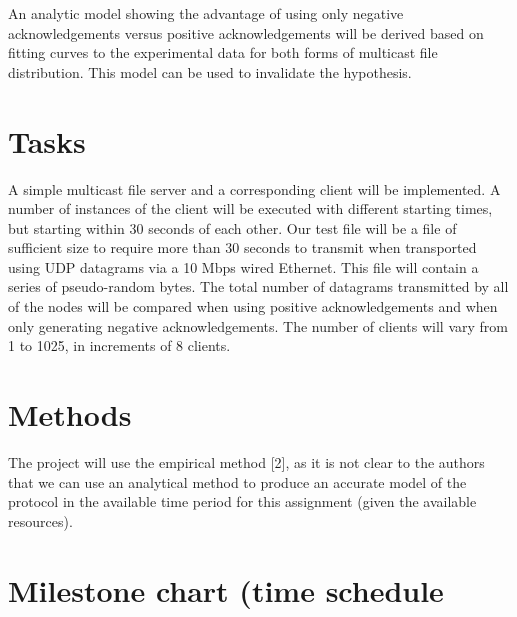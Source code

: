 \documentclass[12pt,twoside]{article}
\begin{document}
An analytic model showing the advantage of using only negative acknowledgements versus positive acknowledgements will be derived based on fitting curves to the experimental data for both forms of multicast file distribution. This model can be used to invalidate the hypothesis.

\section{Tasks}
\label{sec:tasks}


A simple multicast file server and a corresponding client will be implemented. A number of instances of the client will be executed with different starting times, but starting within 30 seconds of each other. Our test file will be a file of sufficient size to require more than 30 seconds to transmit when transported using UDP datagrams via a 10 Mbps wired Ethernet. This file will contain a series of pseudo-random bytes. The total number of datagrams transmitted by all of the nodes will be compared when using positive acknowledgements and when only generating negative acknowledgements. The number of clients will vary from 1 to 1025, in increments of 8 clients.

\section{Methods}
\label{sec:methods}


The project will use the empirical method [2], as it is not clear to the authors that we can use an analytical method to produce an accurate model of the protocol in the available time period for this assignment (given the available resources).

\section{Milestone chart (time schedule}
\label{sec:milestone-chart}

\end{document}
